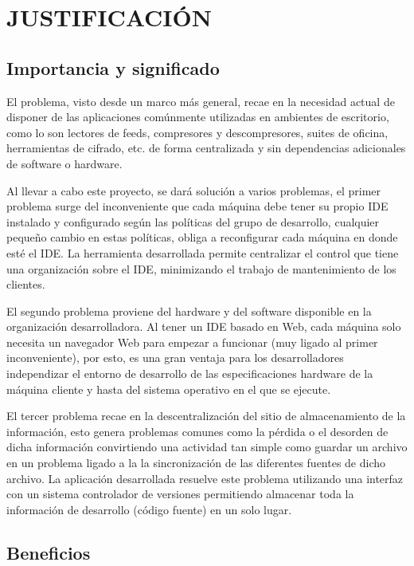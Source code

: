 \section{JUSTIFICACIÓN}


\subsection{Importancia y significado}

El problema, visto desde un marco más general, recae en la necesidad actual de disponer de las aplicaciones comúnmente utilizadas en ambientes de escritorio, como lo son lectores de feeds, compresores y descompresores, suites de oficina, herramientas de cifrado, etc. de forma centralizada y sin dependencias adicionales de software o hardware.

Al llevar a cabo este proyecto, se dará solución a varios problemas, el primer problema surge del inconveniente que cada máquina debe tener su propio IDE instalado y configurado según las políticas del grupo de desarrollo, cualquier pequeño cambio en estas políticas, obliga a reconfigurar cada máquina en donde esté el IDE. La herramienta desarrollada permite centralizar el control que tiene una organización sobre el IDE, minimizando el trabajo de mantenimiento de los clientes.

El segundo problema proviene del hardware y del software disponible en la organización desarrolladora. Al tener un IDE basado en Web, cada máquina solo necesita un navegador Web para empezar a funcionar (muy ligado al primer inconveniente), por esto, es una gran ventaja para los desarrolladores independizar el entorno de desarrollo de las especificaciones hardware de la máquina cliente y hasta del sistema operativo en el que se ejecute.

El tercer problema recae en la descentralización del sitio de almacenamiento de la información, esto genera problemas comunes como la pérdida o el desorden de dicha información convirtiendo una actividad tan simple como guardar un archivo en un problema ligado a la la sincronización de las diferentes fuentes de dicho archivo. La aplicación desarrollada resuelve este problema utilizando una interfaz con un sistema controlador de versiones permitiendo almacenar toda la información de desarrollo (código fuente) en un solo lugar.


\subsection{Beneficios}

